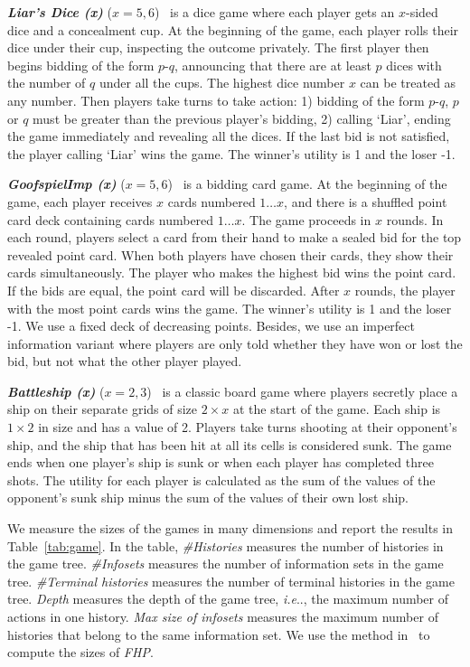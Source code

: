 \documentclass[letterpaper]{article} %
\makeatletter
\DeclareRobustCommand\onedot{\futurelet\@let@token\@onedot}
\def\@onedot{\ifx\@let@token.\else.\null\fi\xspace}
\def\ie{\emph{i.e}\onedot} \def\Ie{\emph{I.e}\onedot}
\makeatother
\begin{document}
\textbf{\textit{Liar's Dice (x)}} ($x=5,6$)~\cite{lisy2015online} is a dice game where each player gets an $x$-sided dice and a concealment cup. At the beginning of the game, each player rolls their dice under their cup, inspecting the outcome privately. The first player then begins bidding of the form $p$-$q$, announcing that there are at least $p$ dices with the number of $q$ under all the cups. The highest dice number $x$ can be treated as any number. Then players take turns to take action: 1) bidding of the form $p$-$q$, $p$ or $q$ must be greater than the previous player's bidding, 2) calling `Liar', ending the game immediately and revealing all the dices. If the last bid is not satisfied, the player calling `Liar' wins the game. The winner's utility is 1 and the loser -1.

\textbf{\textit{GoofspielImp (x)}} ($x=5,6$)~\cite{ross1971goofspiel} is a bidding card game. At the beginning of the game, each player receives $x$ cards numbered $1 \ldots x$, and there is a shuffled point card deck containing cards numbered $1 \ldots x$. The game proceeds in $x$ rounds. In each round, players select a card from their hand to make a sealed bid for the top revealed point card. When both players have chosen their cards, they show their cards simultaneously. The player who makes the highest bid wins the point card. If the bids are equal, the point card will be discarded. After $x$ rounds, the player with the most point cards wins the game. The winner's utility is 1 and the loser -1. We use a fixed deck of decreasing points. Besides, we use an imperfect information variant where players are only told whether they have won or lost the bid, but not what the other player played.

\textbf{\textit{Battleship (x)}} ($x=2,3$)~\cite{farina2019correlation} is a classic board game where players secretly place a ship on their separate grids of size $2 \times x$ at the start of the game. 
Each ship is $1 \times 2$ in size and has a value of 2. 
Players take turns shooting at their opponent's ship, and the ship that has been hit at all its cells is considered sunk.
The game ends when one player's ship is sunk or when each player has completed three shots. 
The utility for each player is calculated as the sum of the values of the opponent's sunk ship minus the sum of the values of their own lost ship.

We measure the sizes of the games in many dimensions and report the results in Table~\ref{tab:game}.
In the table, \emph{\#Histories} measures the number of histories in the game tree.
\emph{\#Infosets} measures the number of information sets in the game tree.
\emph{\#Terminal histories} measures the number of terminal histories in the game tree.
\emph{Depth} measures the depth of the game tree, \ie, the maximum number of actions in one history.
\emph{Max size of infosets} measures the maximum number of histories that belong to the same information set.
We use the method in~\cite{johanson2013measuring} to compute the sizes of \textit{FHP}.
\end{document}
